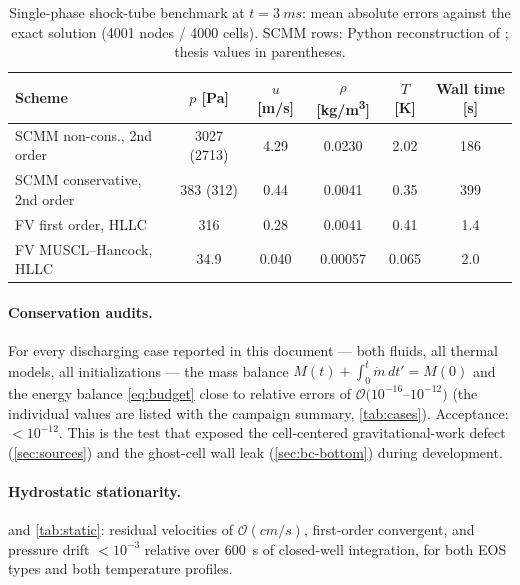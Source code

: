 \documentclass[11pt]{article}
\newcommand{\mdot}{\dot{m}}
\begin{document}
\begin{table}[htb]
\centering
\caption{Single-phase shock-tube benchmark at $t=\SI{3}{ms}$: mean
absolute errors against the exact solution (4001 nodes / 4000 cells).
SCMM rows: Python reconstruction of \citet{gessner2010}; thesis values
in parentheses.}
\label{tab:shocktube}
\begin{tabular}{lccccc}
\toprule
Scheme & $p$ [\si{Pa}] & $u$ [\si{m/s}] & $\rho$ [\si{kg/m^3}] & $T$ [\si{K}] & Wall time [\si{s}]\\
\midrule
SCMM non-cons., 2nd order & 3027 (2713) & 4.29 & 0.0230 & 2.02 & 186\\
SCMM conservative, 2nd order & 383 (312) & 0.44 & 0.0041 & 0.35 & 399\\
FV first order, HLLC & 316 & 0.28 & 0.0041 & 0.41 & 1.4\\
FV MUSCL--Hancock, HLLC & 34.9 & 0.040 & 0.00057 & 0.065 & 2.0\\
\bottomrule
\end{tabular}
\end{table}

\paragraph{Conservation audits.} For every discharging case reported
in this document --- both fluids, all thermal models, all
initializations --- the mass balance
$M(t) + \int_0^t \mdot\,dt' = M(0)$ and the energy balance
\cref{eq:budget} close to relative errors of
$\mathcal{O}(10^{-16}$--$10^{-12})$ (the individual values are listed
with the campaign summary, \cref{tab:cases}). Acceptance: $<10^{-12}$.
This is the test that exposed the cell-centered gravitational-work
defect (\cref{sec:sources}) and the ghost-cell wall leak
(\cref{sec:bc-bottom}) during development.

\paragraph{Hydrostatic stationarity.}  and
\cref{tab:static}: residual velocities of $\mathcal{O}(\si{cm/s})$,
first-order convergent, and pressure drift $<10^{-3}$ relative over
\SI{600}{s} of closed-well integration, for both EOS types and both
temperature profiles.
\end{document}
